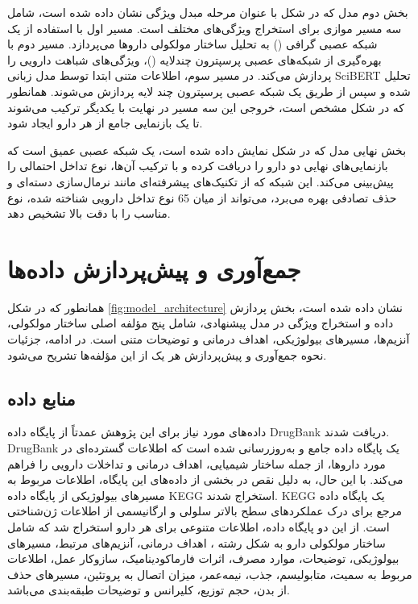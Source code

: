 بخش دوم مدل که در شکل با عنوان مرحله مبدل ویژگی نشان داده شده است، شامل سه مسیر موازی برای استخراج ویژگی‌های مختلف است. مسیر اول با استفاده از یک شبکه عصبی گرافی () به تحلیل ساختار مولکولی داروها می‌پردازد. مسیر دوم با بهره‌گیری از شبکه‌های عصبی پرسپترون چندلایه ()، ویژگی‌های شباهت دارویی را پردازش می‌کند. در مسیر سوم، اطلاعات متنی ابتدا توسط مدل زبانی SciBERT تحلیل شده و سپس از طریق یک شبکه عصبی پرسپترون چند لایه پردازش می‌شوند. همانطور که در شکل مشخص است، خروجی این سه مسیر در نهایت با یکدیگر ترکیب می‌شوند تا یک بازنمایی جامع از هر دارو ایجاد شود.

بخش نهایی مدل که در شکل نمایش داده شده است، یک شبکه عصبی عمیق است که بازنمایی‌های نهایی دو دارو را دریافت کرده و با ترکیب آن‌ها، نوع تداخل احتمالی را پیش‌بینی می‌کند. این شبکه که از تکنیک‌های پیشرفته‌ای مانند نرمال‌سازی دسته‌ای و حذف تصادفی بهره می‌برد، می‌تواند از میان 65 نوع تداخل دارویی شناخته شده، نوع مناسب را با دقت بالا تشخیص دهد.

\section{جمع‌آوری و پیش‌پردازش داده‌ها}

همانطور که در شکل \ref{fig:model_architecture} نشان داده شده است، بخش پردازش داده و استخراج ویژگی در مدل پیشنهادی، شامل پنج مؤلفه اصلی ساختار مولکولی، آنزیم‌ها، مسیرهای بیولوژیکی، اهداف درمانی و توضیحات متنی است. در ادامه، جزئیات نحوه جمع‌آوری و پیش‌پردازش هر یک از این مؤلفه‌ها تشریح می‌شود.

\subsection{منابع داده}

داده‌های مورد نیاز برای این پژوهش عمدتاً از پایگاه داده DrugBank \cite{ref_drugbank} دریافت شدند. DrugBank یک پایگاه داده جامع و به‌روزرسانی شده است که اطلاعات گسترده‌ای در مورد داروها، از جمله ساختار شیمیایی، اهداف درمانی و تداخلات دارویی را فراهم می‌کند. با این حال، به دلیل نقص در بخشی از داده‌های این پایگاه، اطلاعات مربوط به مسیرهای بیولوژیکی از پایگاه داده KEGG \cite{ref_kegg} استخراج شدند. KEGG یک پایگاه داده مرجع برای درک عملکردهای سطح بالاتر سلولی و ارگانیسمی از اطلاعات ژن‌شناختی است. از این دو پایگاه داده، اطلاعات متنوعی برای هر دارو استخراج شد که شامل ساختار مولکولی دارو به شکل رشته ، اهداف درمانی، آنزیم‌های مرتبط، مسیرهای بیولوژیکی، توضیحات، موارد مصرف، اثرات فارماکودینامیک، سازوکار عمل، اطلاعات مربوط به سمیت، متابولیسم، جذب، نیمه‌عمر، میزان اتصال به پروتئین، مسیرهای حذف از بدن، حجم توزیع، کلیرانس و توضیحات طبقه‌بندی می‌باشد.

